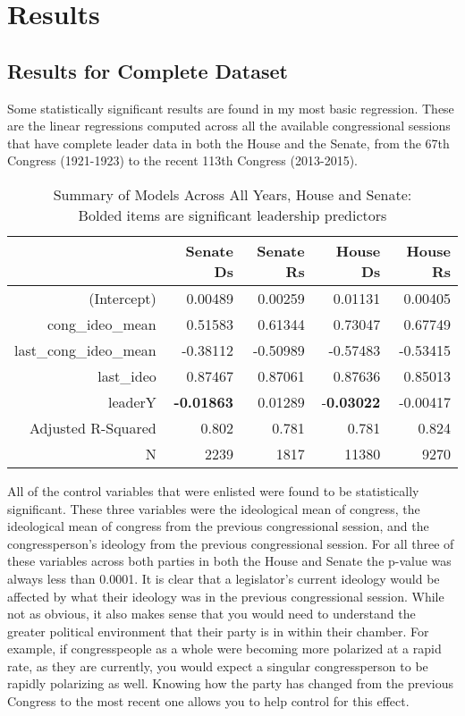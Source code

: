 \documentclass[12pt,twoside]{reedthesis}
\begin{document}
  \chapter{Results}\label{results}
  
  \section{Results for Complete
  Dataset}\label{results-for-complete-dataset}
  
  Some statistically significant results are found in my most basic
  regression. These are the linear regressions computed across all the
  available congressional sessions that have complete leader data in both
  the House and the Senate, from the 67th Congress (1921-1923) to the
  recent 113th Congress (2013-2015).
  
  \begin{table}[h]
  \centering
  \caption{Summary of Models Across All Years, House and Senate: \\ Bolded items are significant leadership predictors}
  \begin{tabular}{r|rrrr}
                         & Senate Ds & Senate Rs & House Ds & House Rs \\ \hline
  (Intercept)            & 0.00489   & 0.00259   & 0.01131  & 0.00405  \\
  cong\_ideo\_mean       & 0.51583   & 0.61344   & 0.73047  & 0.67749  \\
  last\_cong\_ideo\_mean & -0.38112  & -0.50989  & -0.57483 & -0.53415 \\
  last\_ideo             & 0.87467   & 0.87061   & 0.87636  & 0.85013  \\
  leaderY                & \textbf{-0.01863}  & 0.01289   & -\textbf{0.03022} & -0.00417 \\
  Adjusted R-Squared     & 0.802     & 0.781     & 0.781    & 0.824    \\
  N                      & 2239      & 1817      & 11380    & 9270    
  \end{tabular}
  \end{table}
  
  All of the control variables that were enlisted were found to be
  statistically significant. These three variables were the ideological
  mean of congress, the ideological mean of congress from the previous
  congressional session, and the congressperson's ideology from the
  previous congressional session. For all three of these variables across
  both parties in both the House and Senate the p-value was always less
  than 0.0001. It is clear that a legislator's current ideology would be
  affected by what their ideology was in the previous congressional
  session. While not as obvious, it also makes sense that you would need
  to understand the greater political environment that their party is in
  within their chamber. For example, if congresspeople as a whole were
  becoming more polarized at a rapid rate, as they are currently, you
  would expect a singular congressperson to be rapidly polarizing as well.
  Knowing how the party has changed from the previous Congress to the most
  recent one allows you to help control for this effect.
  
\end{document}

